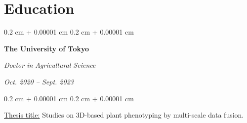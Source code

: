 \documentclass[10pt, letterpaper]{article}
\newenvironment{highlights}{
    \begin{itemize}[
        topsep=0.10 cm,
        parsep=0.10 cm,
        partopsep=0pt,
        itemsep=0pt,
        leftmargin=0.4 cm + 10pt
    ]
}{
    \end{itemize}
} %
\newenvironment{onecolentry}{
    \begin{adjustwidth}{
        0.2 cm + 0.00001 cm
    }{
        0.2 cm + 0.00001 cm
    }
}{
    \end{adjustwidth}
} %
\newenvironment{twocolentry}[2][]{
    \onecolentry
    \def\secondColumn{#2}
    \setcolumnwidth{\fill, 4.5 cm}
    \begin{paracol}{2}
}{
    \switchcolumn \raggedleft \secondColumn
    \end{paracol}
    \endonecolentry
} %
\let\hrefWithoutArrow\href
\renewcommand{\href}[2]{\hrefWithoutArrow{#1}{\ifthenelse{\equal{#2}{}}{ }{#2 }\raisebox{.15ex}{\footnotesize \faExternalLink*}}}
\begin{document}


    \section{Education}
        
        \begin{twocolentry}{
            \textit{Oct. 2020 – Sept. 2023}}
            \textbf{The University of Tokyo}

            \textit{Doctor in Agricultural Science}
        \end{twocolentry}

        \vspace{0.10 cm}
        \begin{onecolentry}
            \underline{Thesis title:} Studies on 3D-based plant phenotyping by multi-scale data fusion.
        \end{onecolentry}



\end{document}
